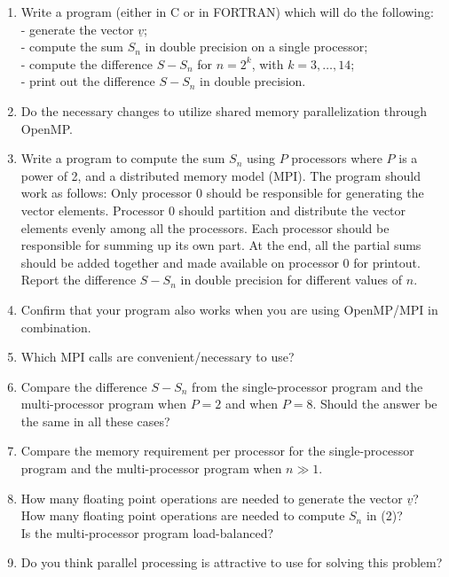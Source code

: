 \documentclass[11pt]{article}
\begin{document}
\begin{enumerate}
\item Write a program (either in C or in FORTRAN) which will do the following: \\
- generate the vector $\underline{v}$; \\
- compute the sum $S_n$ in double precision on a single processor; \\
- compute the difference $S-S_n$ for $n=2^k$, with $k=3,\ldots,14$; \\
- print out the difference $S-S_n$ in double precision.

\item Do the necessary changes to utilize shared memory parallelization
through OpenMP.

\item Write a program to compute the sum $S_n$ using $P$ processors
where $P$ is a power of 2, and a distributed memory model (MPI).
The program should work as follows:
Only processor 0 should be responsible for generating the vector elements. 
Processor 0 should partition and distribute the vector elements evenly 
among all the processors. 
Each processor should be responsible for summing up its own part. 
At the end, all the partial sums should be added together and made available 
on processor 0 for printout. Report the difference $S-S_n$ in double precision 
for different values of $n$.

\item Confirm that your program also works when you are using OpenMP/MPI in combination.

\item Which MPI calls are convenient/necessary to use?
\item Compare the difference $S-S_n$ from the single-processor program and the 
multi-processor program when $P=2$ and when $P=8$. 
Should the answer be the same in all these cases?
\item Compare the memory requirement per processor for the 
single-processor program and the multi-processor program when $n\gg1 $.
\item How many floating point operations are needed to generate the vector $\underline{v}$?\\
How many floating point operations are needed to compute $S_n$ in (2)? \\  
Is the multi-processor program load-balanced?
\item Do you think parallel processing is attractive to use for solving this problem?
\end{enumerate}
\end{document}
